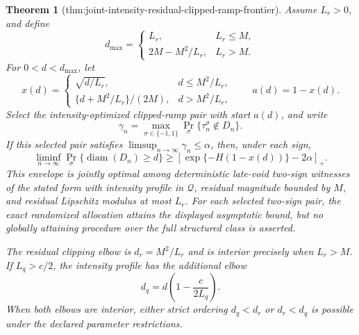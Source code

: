 \documentclass{article}
\newtheorem{theorem}{Theorem}
\begin{document}
\begin{theorem}[thm:joint-intensity-residual-clipped-ramp-frontier]\label{thm:joint-intensity-residual-clipped-ramp-frontier}
Assume \(L_r>0\), and define
\[
 d_{\max}=\begin{cases}
 L_r,&L_r\le M,\\
 2M-M^2/L_r,&L_r>M.
 \end{cases}
\]
For \(0<d<d_{\max}\), let
\[
 x(d)=\begin{cases}
 \sqrt{d/L_r},&d\le M^2/L_r,\\
 \{d+M^2/L_r\}/(2M),&d>M^2/L_r,
 \end{cases}
 \qquad a(d)=1-x(d).
\]
Select the intensity-optimized clipped-ramp pair with start \(a(d)\), and write
\[
 \gamma_n=\max_{\sigma\in\{-1,1\}}
 \Pr_\sigma\{\tau_n^\sigma\notin D_n\}.
\]
If this selected pair satisfies \(\limsup_{n\to\infty}\gamma_n\le\alpha\), then, under each sign,
\[
 \liminf_{n\to\infty}
 \Pr_\sigma\{\operatorname{diam}(D_n)\ge d\}
 \ge
 \left[\exp\{-H(1-x(d))\}-2\alpha\right]_+.
\]
This envelope is jointly optimal among deterministic late-void two-sign witnesses of the stated form with intensity profile in \(\mathcal Q\), residual magnitude bounded by \(M\), and residual Lipschitz modulus at most \(L_r\). For each selected two-sign pair, the exact randomized allocation attains the displayed asymptotic bound, but no globally attaining procedure over the full structured class is asserted.

The residual clipping elbow is \(d_r=M^2/L_r\) and is interior precisely when \(L_r>M\). If \(L_q>c/2\), the intensity profile has the additional elbow
\[
 d_q=d\!\left(1-\frac{c}{2L_q}\right).
\]
When both elbows are interior, either strict ordering \(d_q<d_r\) or \(d_r<d_q\) is possible under the declared parameter restrictions.
\end{theorem}
\end{document}
